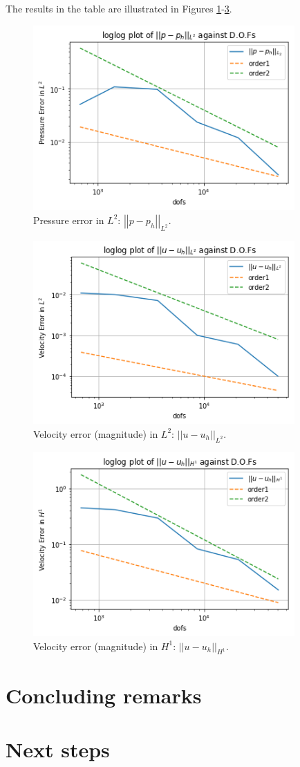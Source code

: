 \documentclass[12pt,a4paper]{article}
\theoremstyle{definition}
\begin{document}
The results in the table are illustrated in Figures \ref{fig_pL2}-\ref{fig_uH1}.
\begin{figure}[H]
	\centering
	\includegraphics[width=10cm]{p_h_L2}
	\caption{Pressure error in $L^2$: $\left|\left|p-p_h\right|\right|_{L^2}$.}
	\label{fig_pL2}
\end{figure}
\begin{figure}[H]
	\centering
	\includegraphics[width=10cm]{u_uh_L2}
	\caption{Velocity error (magnitude) in $L^2$: $\left|\left|u-u_h\right|\right|_{L^2}$.}
	\label{fig_uL2}
\end{figure}
\begin{figure}[H]
	\centering
	\includegraphics[width=10cm]{u_uh_H1}
	\caption{Velocity error (magnitude) in $H^1$: $\left|\left|u-u_h\right|\right|_{H^1}$.}
	\label{fig_uH1}
\end{figure}
\section{Concluding remarks}\label{sec_conclusion}
\section{Next steps}


\end{document}
